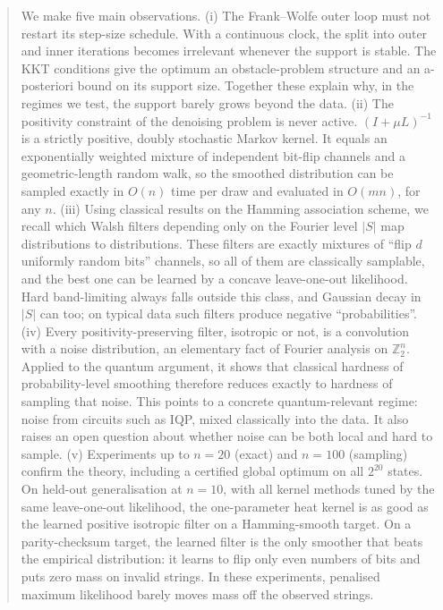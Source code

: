 \documentclass[11pt]{article}
\theoremstyle{definition}
\theoremstyle{remark}
\begin{document}
\begin{abstract}
We make five main observations.
(i) The Frank--Wolfe outer loop must not restart its step-size schedule. With a continuous clock, the split into outer and inner iterations becomes irrelevant whenever the support is stable. The KKT conditions give the optimum an obstacle-problem structure and an a-posteriori bound on its support size. Together these explain why, in the regimes we test, the support barely grows beyond the data.
(ii) The positivity constraint of the denoising problem is never active. $(I+\mu L)^{-1}$ is a strictly positive, doubly stochastic Markov kernel. It equals an exponentially weighted mixture of independent bit-flip channels and a geometric-length random walk, so the smoothed distribution can be sampled exactly in $O(n)$ time per draw and evaluated in $O(mn)$, for any $n$.
(iii) Using classical results on the Hamming association scheme, we recall which Walsh filters depending only on the Fourier level $|S|$ map distributions to distributions. These filters are exactly mixtures of ``flip $d$ uniformly random bits'' channels, so all of them are classically samplable, and the best one can be learned by a concave leave-one-out likelihood. Hard band-limiting always falls outside this class, and Gaussian decay in $|S|$ can too; on typical data such filters produce negative ``probabilities''.
(iv) Every positivity-preserving filter, isotropic or not, is a convolution with a noise distribution, an elementary fact of Fourier analysis on $\mathbb{Z}_2^n$. Applied to the quantum argument, it shows that classical hardness of probability-level smoothing therefore reduces exactly to hardness of sampling that noise. This points to a concrete quantum-relevant regime: noise from circuits such as IQP, mixed classically into the data. It also raises an open question about whether noise can be both local and hard to sample.
(v) Experiments up to $n=20$ (exact) and $n=100$ (sampling) confirm the theory, including a certified global optimum on all $2^{20}$ states. On held-out generalisation at $n=10$, with all kernel methods tuned by the same leave-one-out likelihood, the one-parameter heat kernel is as good as the learned positive isotropic filter on a Hamming-smooth target. On a parity-checksum target, the learned filter is the only smoother that beats the empirical distribution: it learns to flip only even numbers of bits and puts zero mass on invalid strings. In these experiments, penalised maximum likelihood barely moves mass off the observed strings.
\end{abstract}

\end{document}
